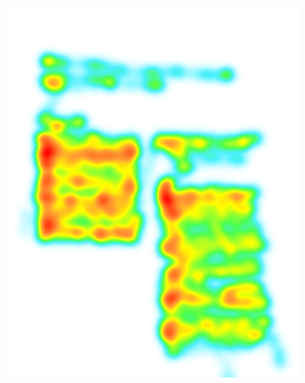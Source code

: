 \begin{figure}
    \centering
    \begin{minipage}{0.5\textwidth}
        \centering
        \includegraphics[width=\textwidth]{Images/DataQuality/PaperHeatmap.png}
    \end{minipage}\hfill
    \begin{minipage}{0.5\textwidth}
        \centering

\end{minipage}
\end{figure}
